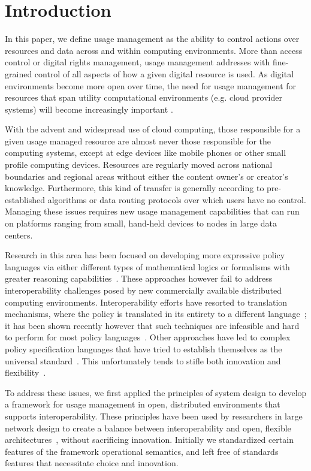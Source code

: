 \section{Introduction}
In this paper, we define usage management as the ability to control actions over resources and data across and within computing environments.  More than access control or digital rights management, usage management addresses with fine-grained control of all aspects of how a given digital resource is used.  As digital environments become more open over time, the need for usage management for resources that span utility computational environments (e.g. cloud provider systems) will become increasingly important \cite{ctrl:lamb-MCCCS,ctrl:lamb-SOSE}.

With the advent and widespread use of cloud computing, those responsible for a given usage managed resource are almost never those responsible for the computing systems, except at edge devices like mobile phones or other small profile computing devices.  Resources are regularly moved across national boundaries and regional areas without either the content owner's or creator's knowledge.  Furthermore, this kind of transfer is generally according to pre-established algorithms or data routing protocols over which users have no control.  Managing these issues requires new usage management capabilities that can run on platforms ranging from small, hand-held devices to nodes in large data centers.

Research in this area has been focused on developing more expressive policy languages via either different types of mathematical logics or formalisms with greater reasoning capabilities~\cite{ArHu:07,BaMi:06,ChCoEtHaJoLa:03,HaWe:04,HaWe:08,PuWe:02,XiBjFu:08}.  These approaches however fail to address interoperability challenges posed by new commercially available distributed computing environments.  Interoperability efforts have resorted to translation mechanisms, where the policy is translated in its entirety to a different language~\cite{HeJa:05,PoPrDe:04,ScTaWo:04}; it has been shown recently however that such techniques are infeasible and hard to perform for most policy languages~\cite{KoLaMaMi:04, SaShUe:04}. Other approaches have led to complex policy specification languages that have tried to establish themselves as the universal standard~\cite{OMADRM,ODRL-req,Wa:04,XrML-spec}.  This unfortunately tends to stifle both innovation and flexibility~\cite{HeJa:05,JaHe:04,JaHe:08,JaHeMa:06}.

To address these issues, we first applied the principles of system design to develop a framework for usage management in open, distributed environments that supports interoperability. These principles have been used by researchers in large network design to create a balance between interoperability and open, flexible architectures~\cite{Al:04,BlCl:01,ClWrSoBr:02}, without sacrificing innovation. Initially we standardized certain features of the framework operational semantics, and left free of standards features that necessitate choice and innovation.

